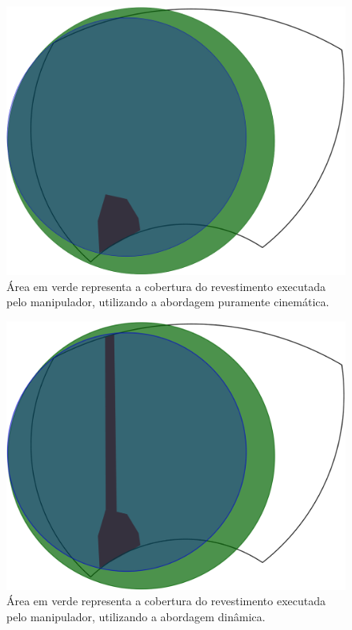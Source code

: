 \begin{figure}[h!]	
	\includegraphics[width=\columnwidth]{figs/dinamica/workspaceCinematica.png}
	\caption{Área em verde representa a cobertura do revestimento executada pelo
	manipulador, utilizando a abordagem puramente cinemática.}
	\label{fig::wcin}
\end{figure}

\begin{figure}[h!]	
	\includegraphics[width=\columnwidth]{figs/dinamica/workspaceTorques.png}
	\caption{Área em verde representa a cobertura do revestimento executada pelo
	manipulador, utilizando a abordagem dinâmica.}
	\label{fig::wdin}
\end{figure}